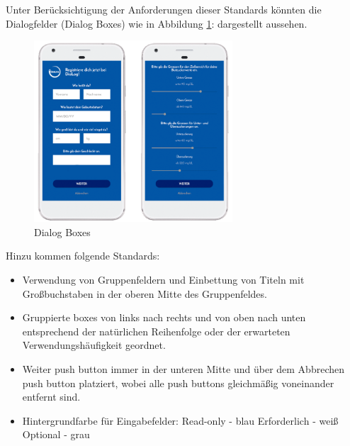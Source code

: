 Unter Berücksichtigung der Anforderungen dieser Standards könnten die Dialogfelder (Dialog Boxes) wie in Abbildung \ref{img:dialogbox}: \glqq {}\grqq{} dargestellt aussehen.
\begin{figure}[H]
	\centering
	\includegraphics[width=0.66\textwidth]{images/DialogBox.png}
	\captionsetup{justification=centering}
	\caption{Dialog Boxes}
	\label{img:dialogbox}
\end{figure}
Hinzu kommen folgende Standards:
\begin{itemize}
	\item Verwendung von Gruppenfeldern und Einbettung von Titeln mit Großbuchstaben in der oberen Mitte des Gruppenfeldes.
	\item Gruppierte boxes von links nach rechts und von oben nach unten entsprechend der natürlichen Reihenfolge oder der erwarteten Verwendungshäufigkeit geordnet.
	\item \glqq Weiter\grqq{} push button immer in der unteren Mitte und über dem \glqq Abbrechen\grqq{} push button platziert, wobei alle push buttons gleichmäßig voneinander entfernt sind.
	\item Hintergrundfarbe für Eingabefelder:\newline
		\noindent\hspace*{10mm}Read-only - blau \newline
		\noindent\hspace*{10mm}Erforderlich - weiß \newline
		\noindent\hspace*{10mm}Optional - grau 
\end{itemize}
\newpage
